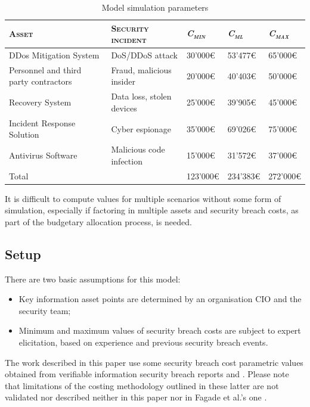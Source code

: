 \begin{table}[H]
    \centering
    \begin{tabular}{|p{6cm}|p{4cm}|p{1.3cm}|p{1.3cm}|p{1.3cm}|}
        \hline
        \textsc{Asset} & \textsc{Security incident} & \textsc{\textit{C\textsubscript{min}}} & \textsc{\textit{C\textsubscript{ml}}} & \textsc{\textit{C\textsubscript{max}}} \\
        \hline
        DDos Mitigation System & DoS/DDoS attack & 30'000€ & 53'477€ & 65'000€ \\
        \hline
        Personnel and third party contractors & Fraud, malicious insider & 20'000€ & 40'403€ & 50'000€ \\
        \hline
        Recovery System & Data loss, stolen devices & 25'000€ & 39'905€ & 45'000€ \\
        \hline
        Incident Response Solution & Cyber espionage & 35'000€ & 69'026€ & 75'000€ \\
        \hline
        Antivirus Software & Malicious code infection & 15'000€ & 31'572€ & 37'000€ \\
        \hline
        Total & & 123'000€ & 234'383€ & 272'000€ \\
        \hline
    \end{tabular}
    \caption{Model simulation parameters}
    \label{tab:simulation_parameters}
\end{table}

It is difficult to compute values for multiple scenarios without some form of simulation, especially if factoring in multiple assets and security breach costs, as part of the budgetary allocation process, is needed.

\subsection{Setup}
There are two basic assumptions for this model:
\begin{itemize}
    \item Key information asset points are determined by an organisation CIO and the security team;
    \item Minimum and maximum values of security breach costs are subject to expert elicitation, based on experience and previous security breach events.
\end{itemize}

The work described in this paper use some security breach cost parametric values obtained from verifiable information security breach reports \parencite{Ponemon} and \parencite{Kaspersky}.
Please note that limitations of the costing methodology outlined in these latter are not validated nor described neither in this paper nor in Fagade et al.'s one \parencite{Fagade}.

